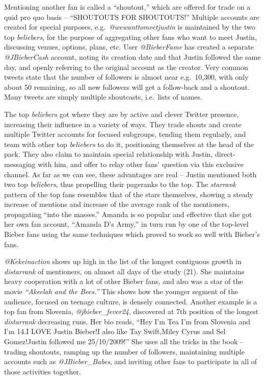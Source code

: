 \documentclass[10pt,oneside]{memoir}
\begin{document}
Mentioning another fan is called a ``shoutout,'' which are offered for trade on a quid pro quo basis -- ``SHOUTOUTS FOR SHOUTOUTS!''  Multiple accounts are created for special purposes, e.g.\ {\itshape @wewanttomeetjustin} is maintained by the two top {\itshape beliebers}, for the purpose of aggregating other fans who want to meet Justin, discussing venues, options, plans, etc.  User {\itshape @BieberFame} has created a separate {\itshape @JBieberCash} account, noting its creation date and that Justin followed the same day, and openly referring to the original account as the creator.  Very common tweets state that the number of followers is almost near e.g.\ 10,300, with only about 50 remaining, so all new followers will get a follow-back and a shoutout.  Many tweets are simply multiple shoutcasts, i.e.\ lists of names.


The top {\itshape beliebers} got where they are by active and clever Twitter presence, increasing their influence in a variety of ways.  They trade shouts and create multiple Twitter accounts for focused subgroups, tending them regularly, and team with other top {\itshape beliebers} to do it, positioning themselves at the head of the pack.  They also claim to maintain special relationship with Justin, direct-messaging with him, and offer to relay other fans' question via this exclusive channel.  As far as we can see, these advantages are real -- Justin mentioned both two top {\itshape beliebers}, thus propelling their pageranks to the top.  The {\itshape starrank} pattern of the top fans resembles that of the stars themselves, showing a steady increase of mentions and increase of the average rank of the mentioners, propagating ``into the masses.''  Amanda is so popular and effective that she got her own fan account, ``Amanda D's Army,'' in turn run by one of the top-level Bieber fans using the same techniques which proved to work so well with Bieber's fans.


{\itshape @Kekeinaction} shows up high in the list of the longest contiguous growth in {\itshape distarrank} of mentioners, on almost all days of the study (21).  She maintains heavy cooperation with a lot of other Bieber fans, and also was a star of the movie {\itshape ``Akeelah and the Bees.''} This shows how the younger segment of the audience, focused on teenage culture, is densely connected.  Another example is a top fan from Slovenia, \emph{@jbieber\_fever24}, discovered at 7th position of the longest {\itshape distarrank} decreasing runs.  Her bio reads,
``Hey I'm Tea I'm from Slovenia and I'm 14.I LOVE Justin Bieber!I also like Tay Swift,Miley Cyrus and Sel Gomez!Justin followed me 25/10/2009!''  She uses all the tricks in the book -- trading shoutouts, ramping up the number of followers, maintaining multiple accounts such as  \emph{@JBieber\_Babes}, and inviting other fans to participate in all of those activities together.
\end{document}

